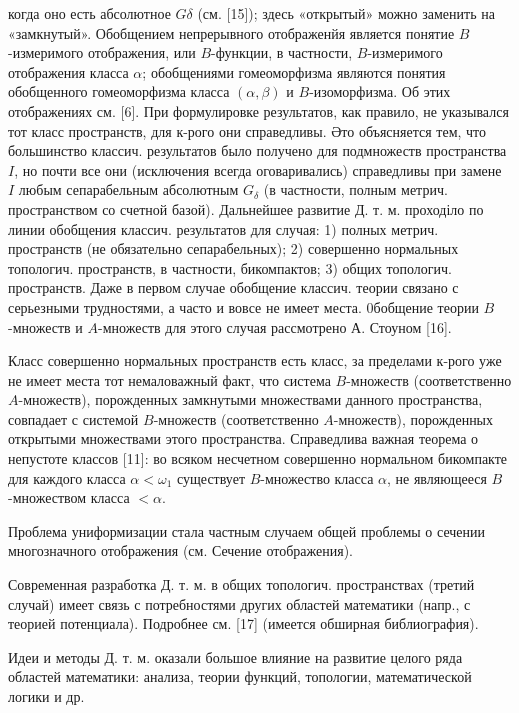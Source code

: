 \documentclass[10pt]{article}
\begin{document}
когда оно есть абсолютное $G \delta$ (см. [15]); здесь «открытый» можно заменить на «замкнутый». Обобщением непрерывного отображенйя является понятие $B$-измеримого отображения, или $B$-функции, в частности, $B$-измеримого отображения класса $\alpha$; обобщениями гомеоморфизма являются понятия обобщенного гомеоморфизма класса $(\alpha, \beta)$ и $B$-изоморфизма. Об этих отображениях см. [6]. При формулировке результатов, как правило, не указывался тот класс пространств, для к-рого они справедливы. Әто объясняется тем, что большинство классич. результатов было получено для подмножеств пространства $I$, но почти все они (исключения всегда оговаривались) справедливы при замене $I$ любым сепарабельным абсолютным $G_{\delta}$ (в частности, полным метрич. пространством со счетной базой). Дальнейшее развитие Д. т. м. проходіло по линии обобщения классич. результатов для случая: 1) полных метрич. пространств (не обязательно сепарабельных); 2) совершенно нормальных топологич. пространств, в частности, бикомпактов; 3) общих топологич. пространств. Даже в первом случае обобщение классич. теории связано с серьезными трудностями, а часто и вовсе не имеет места. 0бобщение теории $B$-множеств и $A$-множеств для этого случая рассмотрено А. Стоуном [16].



Класс совершенно нормальных пространств есть класс, за пределами к-рого уже не имеет места тот немаловажный факт, что система $B$-множеств (соответственно $A$-множеств), порожденных замкнутыми множествами данного пространства, совпадает с системой $B$-множеств (соответственно $A$-множеств), порожденных открытыми множествами этого пространства. Справедлива важная теорема о непустоте классов [11]: во всяком несчетном совершенно нормальном бикомпакте для каждого класса $\alpha<\omega_{1}$ существует $B$-множество класса $\alpha$, не являющееся $B$-множеством класса $<\alpha$.



Проблема униформизации стала частным случаем общей проблемы о сечении многозначного отображения (см. Сечение отображения).



Современная разработка Д. т. м. в общих топологич. пространствах (третий случай) имеет связь с потребностями других областей математики (напр., с теорией потенциала). Подробнее см. [17] (имеется обширная библиография).



Идеи и методы Д. т. м. оказали большое влияние на развитие целого ряда областей математики: анализа, теории функций, топологии, математической логики и др.
\end{document}
